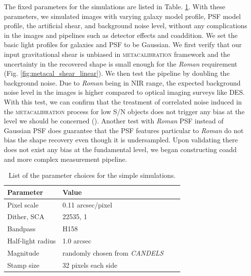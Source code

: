 \documentclass[fleqn,usenatbib]{mnras}
\begin{document}
The fixed parameters for the simulations are listed in Table. \ref{tab:params}. With these parameters, we simulated images with varying galaxy model profile, PSF model profile, the artificial shear, and background noise level, without any complications in the images and pipelines such as detector effects and coaddition. We set the basic light profiles for galaxies and PSF to be Gaussian. We first verify that our input gravitational shear is unbiased in \textsc{metacalibration} framework and the uncertainty in the recovered shape is small enough for the \emph{Roman} requirement (Fig. \ref{fig:metacal_shear_linear}). We then test the pipeline by doubling the background noise. Due to \emph{Roman} being in NIR range, the expected background noise level in the images is higher compared to optical imaging surveys like DES. With this test, we can confirm that the treatment of correlated noise induced in the  \textsc{metacalibration} process for low S/N objects does not trigger any bias at the level we should be concerned (\citealt{2017ApJ...841...24S}). Another test with \emph{Roman} PSF instead of Gaussian PSF does guarantee that the PSF features particular to \emph{Roman} do not bias the shape recovery even though it is undersampled. Upon validating there does not exist any bias at the fundamental level, we began constructing coadd and more complex measurement pipeline. 
\begin{table}
    \centering
    \begin{tabular}[width=\columnwidth]{|p{3cm}||p{3cm}|p{3cm}|p{3cm}|}
    \hline
    Parameter & Value \\
    \hline
    Pixel scale & 0.11 arcsec/pixel\\
    Dither, SCA & 22535, 1 \\ 
    Bandpass & H158 \\
    Half-light radius & 1.0 arcsec\\
    Magnitude & randomly chosen from \emph{CANDELS} \\ 
    Stamp size & 32 pixels each side\\
    \hline
    \end{tabular}
    \caption{List of the parameter choices for the simple simulations.}
    \label{tab:params}
\end{table}
\end{document}
